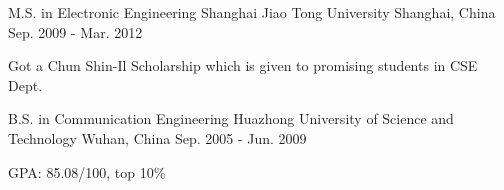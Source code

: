 

\begin{cventries}

  \cventry
    {M.S. in Electronic Engineering} %
    {Shanghai Jiao Tong University} %
    {Shanghai, China} %
    {Sep. 2009 - Mar. 2012} %
    {
      \begin{cvitems} %
        \item {Got a Chun Shin-Il Scholarship which is given to promising students in CSE Dept.}
      \end{cvitems}
    }

  \cventry
    {B.S. in Communication Engineering} %
    {Huazhong University of Science and Technology} %
    {Wuhan, China} %
    {Sep. 2005 - Jun. 2009} %
    {
      \begin{cvitems} %
        \item {GPA: 85.08/100, top 10\%}
      \end{cvitems}
    }

\end{cventries}
